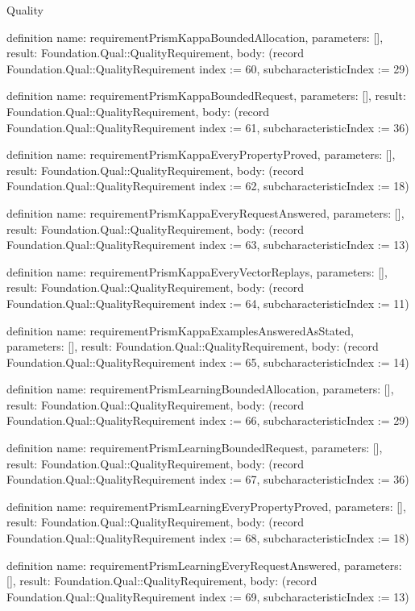 \begin{lexlean}{Quality}
\begin{semanticmodule}
definition{
  name: requirementPrismKappaBoundedAllocation,
  parameters: [],
  result: Foundation.Qual::QualityRequirement,
  body: (record Foundation.Qual::QualityRequirement {index := 60, subcharacteristicIndex := 29})
}

definition{
  name: requirementPrismKappaBoundedRequest,
  parameters: [],
  result: Foundation.Qual::QualityRequirement,
  body: (record Foundation.Qual::QualityRequirement {index := 61, subcharacteristicIndex := 36})
}

definition{
  name: requirementPrismKappaEveryPropertyProved,
  parameters: [],
  result: Foundation.Qual::QualityRequirement,
  body: (record Foundation.Qual::QualityRequirement {index := 62, subcharacteristicIndex := 18})
}

definition{
  name: requirementPrismKappaEveryRequestAnswered,
  parameters: [],
  result: Foundation.Qual::QualityRequirement,
  body: (record Foundation.Qual::QualityRequirement {index := 63, subcharacteristicIndex := 13})
}

definition{
  name: requirementPrismKappaEveryVectorReplays,
  parameters: [],
  result: Foundation.Qual::QualityRequirement,
  body: (record Foundation.Qual::QualityRequirement {index := 64, subcharacteristicIndex := 11})
}

definition{
  name: requirementPrismKappaExamplesAnsweredAsStated,
  parameters: [],
  result: Foundation.Qual::QualityRequirement,
  body: (record Foundation.Qual::QualityRequirement {index := 65, subcharacteristicIndex := 14})
}

definition{
  name: requirementPrismLearningBoundedAllocation,
  parameters: [],
  result: Foundation.Qual::QualityRequirement,
  body: (record Foundation.Qual::QualityRequirement {index := 66, subcharacteristicIndex := 29})
}

definition{
  name: requirementPrismLearningBoundedRequest,
  parameters: [],
  result: Foundation.Qual::QualityRequirement,
  body: (record Foundation.Qual::QualityRequirement {index := 67, subcharacteristicIndex := 36})
}

definition{
  name: requirementPrismLearningEveryPropertyProved,
  parameters: [],
  result: Foundation.Qual::QualityRequirement,
  body: (record Foundation.Qual::QualityRequirement {index := 68, subcharacteristicIndex := 18})
}

definition{
  name: requirementPrismLearningEveryRequestAnswered,
  parameters: [],
  result: Foundation.Qual::QualityRequirement,
  body: (record Foundation.Qual::QualityRequirement {index := 69, subcharacteristicIndex := 13})
}


\end{semanticmodule}
\end{lexlean}
